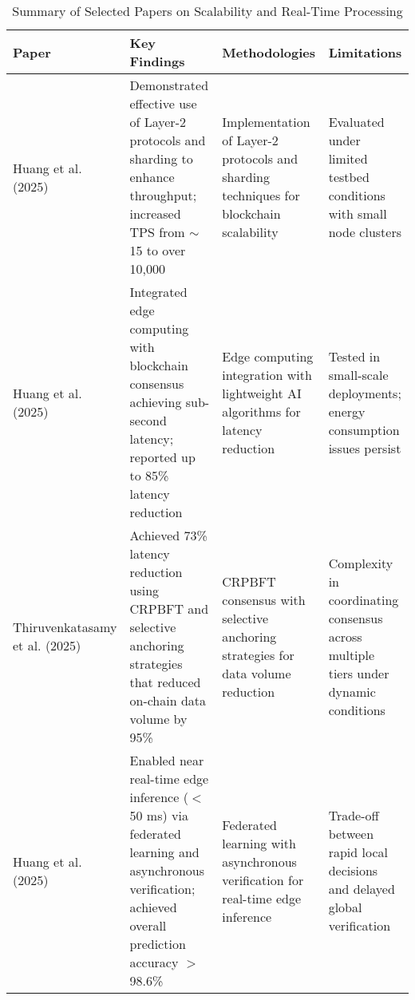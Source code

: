\documentclass[12pt,onecolumn]{IEEEtran} %
\newcommand{\fitToPage}[1]{\begin{adjustbox}{max width=\textwidth}#1\end{adjustbox}}
\renewcommand{\arraystretch}{1.2} %
\begin{document}
\begin{table}[htbp]
\caption{Summary of Selected Papers on Scalability and Real-Time Processing}
\label{tab:scalability}
\centering
\fitToPage{
\begingroup
\setlength{\tabcolsep}{4pt}
\renewcommand{\arraystretch}{1.15}
\footnotesize
\begin{tabularx}{\textwidth}{@{}P{0.18\textwidth}YYY@{}}
\toprule
\textbf{Paper} & \textbf{Key Findings} & \textbf{Methodologies} & \textbf{Limitations} \\
\midrule
Huang et al. (2025) & Demonstrated effective use of Layer-2 protocols and sharding to enhance throughput; increased TPS from $\sim$15 to over 10,000 & Implementation of Layer-2 protocols and sharding techniques for blockchain scalability & Evaluated under limited testbed conditions with small node clusters \\
\addlinespace
Huang et al. (2025) & Integrated edge computing with blockchain consensus achieving sub-second latency; reported up to 85\% latency reduction & Edge computing integration with lightweight AI algorithms for latency reduction & Tested in small-scale deployments; energy consumption issues persist \\
\addlinespace
Thiruvenkatasamy et al. (2025) & Achieved 73\% latency reduction using CRPBFT and selective anchoring strategies that reduced on-chain data volume by 95\% & CRPBFT consensus with selective anchoring strategies for data volume reduction & Complexity in coordinating consensus across multiple tiers under dynamic conditions \\
\addlinespace
Huang et al. (2025) & Enabled near real-time edge inference ($<$50 ms) via federated learning and asynchronous verification; achieved overall prediction accuracy $>$98.6\% & Federated learning with asynchronous verification for real-time edge inference & Trade-off between rapid local decisions and delayed global verification \\
\bottomrule
\end{tabularx}
\endgroup
}
\end{table}
\end{document}
